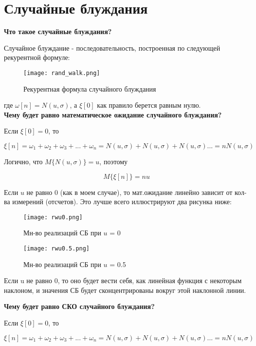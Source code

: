 \chapter{Случайные блуждания}
\label{ch:chap3}

\textbf{Что такое случайные блуждания?}

Случайное блуждание - последовательность, построенная по следующей рекурентной формуле:

\begin{figure}[H]
    \centering
    \texttt{[image: rand\_walk.png]}
    \caption{Рекурентная формула случайного блуждания}
\end{figure}

где $\omega[n] = N(u, \sigma)$, а $\xi[0]$ как правило берется равным нулю.\\


\textbf{Чему будет равно математическое ожидание случайного блуждания?}

Если $\xi[0] = 0$, то

$$\xi[n] = \omega_1 + \omega_2 + \omega_3 + ... + \omega_n = N(u, \sigma) + N(u, \sigma) + N(u, \sigma)... = nN(u, \sigma)$$

Логично, что $M\{N(u, \sigma)\} = u$, поэтому

$$M\{\xi[n]\} = nu$$

Если $u$ не равно 0 (как в моем случае), то мат.ожидание линейно зависит от кол-ва измерений (отсчетов). Это лучше всего иллюстрируют
два рисунка ниже:

\begin{figure}[H]
    \centering
    \texttt{[image: rwu0.png]}
    \caption{Мн-во реализаций СБ при $u$ = 0}
\end{figure}

\begin{figure}[H]
    \centering
    \texttt{[image: rwu0.5.png]}
    \caption{Мн-во реализаций СБ при $u$ = 0.5}
\end{figure}

Если u не равно 0, то оно будет вести себя, как линейная функция с некоторым наклоном, и значения СБ будет сконцентрированы вокруг
этой наклонной линии.

\textbf{Чему будет равно СКО случайного блуждания?}

Если $\xi[0] = 0$, то

$$\xi[n] = \omega_1 + \omega_2 + \omega_3 + ... + \omega_n = N(u, \sigma) + N(u, \sigma) + N(u, \sigma)... = nN(u, \sigma)$$


